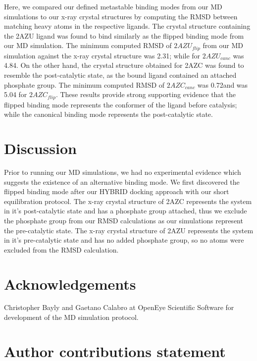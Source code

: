 \documentclass[fleqn,10pt]{wlscirep}
\newcommand{\angstrom}{\text{\normalfont\AA}}
\begin{document}
Here, we compared our defined metastable binding modes from our MD simulations to our x-ray crystal structures by computing the RMSD between matching heavy atoms in the respective ligands.
The crystal structure containing the 2AZU ligand was found to bind similarly as the flipped binding mode from our MD simulation.
The minimum computed RMSD of $2AZU_{flip}$ from our MD simulation against the x-ray crystal structure was 2.31\angstrom; while for $2AZU_{canc}$ was 4.84\angstrom.
On the other hand, the crystal structure obtained for 2AZC was found to resemble the post-catalytic state, as the bound ligand contained an attached phosphate group.
The minimum computed RMSD of $2AZC_{canc}$ was 0.72\angstrom and was 5.04 for $2AZC_{flip}$.
These results provide strong supporting evidence that the flipped binding mode represents the conformer of the ligand before catalysis; while the canonical binding mode represents the post-catalytic state.

\section{Discussion}

Prior to running our MD simulations, we had no experimental evidence which suggests the existence of an alternative binding mode.
We first discovered the flipped binding mode after our HYBRID docking approach with our short equilibration protocol.
The x-ray crystal structure of 2AZC represents the system in it's post-catalytic state and has a phosphate group attached, thus we exclude the phosphate group from our RMSD calculations as our simulations represent the pre-catalytic state.
The x-ray crystal structure of 2AZU represents the system in it's pre-catalytic state and has no added phosphate group, so no atoms were excluded from the RMSD calculation.





\section{Acknowledgements}

Christopher Bayly and Gaetano Calabro at OpenEye Scientific Software for development of the MD simulation protocol.

\section{Author contributions statement}
\end{document}
